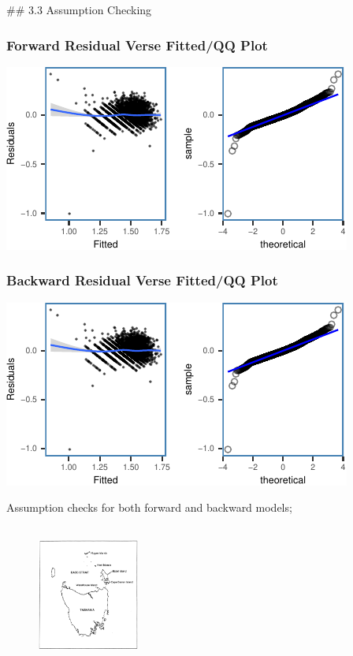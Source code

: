 \documentclass[letterpaper,9pt,twocolumn,twoside,]{pinp}
\begin{document}
 \#\# 3.3 Assumption Checking

\subsubsection{Forward Residual Verse Fitted/QQ
Plot}\label{forward-residual-verse-fittedqq-plot}

\begin{center}\includegraphics{ExecSum_files/figure-latex/unnamed-chunk-4-1} \end{center}

\subsubsection{Backward Residual Verse Fitted/QQ
Plot}\label{backward-residual-verse-fittedqq-plot}

\begin{center}\includegraphics{ExecSum_files/figure-latex/unnamed-chunk-5-1} \end{center}

Assumption checks for both forward and backward models;

\begin{figure}[!h]
    \begin{center}
    \includegraphics[width=0.3\textwidth, height=1.8in]{Independence} 
    \end{center}
\end{figure}
\end{document}
